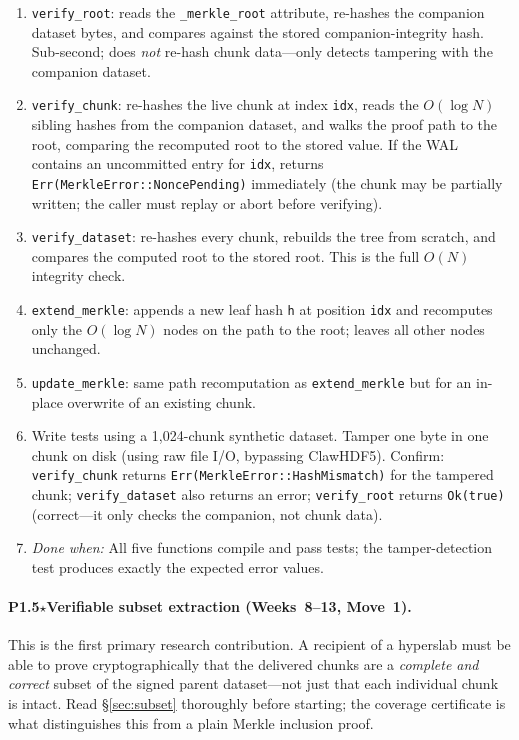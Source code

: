 \documentclass[11pt]{article}
\begin{document}
\begin{enumerate}[nosep]
  \item \texttt{verify\_root}: reads the \texttt{\_merkle\_root} attribute,
    re-hashes the companion dataset bytes, and compares against the stored
    companion-integrity hash. Sub-second; does \emph{not} re-hash chunk
    data---only detects tampering with the companion dataset.
  \item \texttt{verify\_chunk}: re-hashes the live chunk at index \texttt{idx},
    reads the $O(\log N)$ sibling hashes from the companion dataset, and walks
    the proof path to the root, comparing the recomputed root to the stored value.
    If the WAL contains an uncommitted entry for \texttt{idx}, returns
    \texttt{Err(MerkleError::NoncePending)} immediately (the chunk may be
    partially written; the caller must replay or abort before verifying).
  \item \texttt{verify\_dataset}: re-hashes every chunk, rebuilds the tree
    from scratch, and compares the computed root to the stored root.
    This is the full $O(N)$ integrity check.
  \item \texttt{extend\_merkle}: appends a new leaf hash \texttt{h} at position
    \texttt{idx} and recomputes only the $O(\log N)$ nodes on the path to the
    root; leaves all other nodes unchanged.
  \item \texttt{update\_merkle}: same path recomputation as
    \texttt{extend\_merkle} but for an in-place overwrite of an existing chunk.
  \item Write tests using a 1,024-chunk synthetic dataset. Tamper one byte
    in one chunk on disk (using raw file I/O, bypassing ClawHDF5). Confirm:
    \texttt{verify\_chunk} returns \texttt{Err(MerkleError::HashMismatch)}
    for the tampered chunk; \texttt{verify\_dataset} also returns an error;
    \texttt{verify\_root} returns \texttt{Ok(true)} (correct---it only
    checks the companion, not chunk data).
  \item \emph{Done when:} All five functions compile and pass tests; the
    tamper-detection test produces exactly the expected error values.
\end{enumerate}

\paragraph{P1.5$\star$\enspace Verifiable subset extraction
(Weeks~8--13, \textbf{Move~1}).}
This is the first primary research contribution. A recipient of a hyperslab
must be able to prove cryptographically that the delivered chunks are a
\emph{complete and correct} subset of the signed parent dataset---not just
that each individual chunk is intact. Read \S\ref{sec:subset} thoroughly
before starting; the coverage certificate is what distinguishes this from a
plain Merkle inclusion proof.
\end{document}
